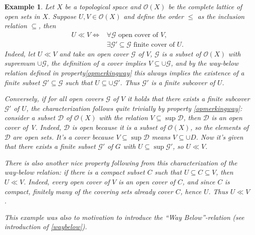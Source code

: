 \documentclass[a4paper,12pt]{article}
\newtheorem{example}[theorem]{Example}
\begin{document}
\begin{example}
Let $X$ be a topological space and $\mathcal{O}(X)$ be the complete lattice of open sets in $X$.  Suppose $U,V \in \mathcal{O}(X)$ and define the order $\leq$ as the inclusion relation $\subseteq$, then
\begin{align*}
 U \ll V \Leftrightarrow &\forall \mathcal{G} \text{ open cover of } V,\\
 &\exists \mathcal{G}' \subseteq \mathcal{G} \text{ finite cover of } U.
\end{align*}
Indeed, let  $U \ll V$ and take an open cover $\mathcal{G}$ of $V$, $\mathcal{G}$ is a subset of $\mathcal{O}(X)$ with supremum $\cup \mathcal{G}$, the definition of a cover implies $V \subseteq  \cup \mathcal{G}$, and by the way-below relation defined in property\ref{opmerkingway} this always implies the existence of a finite subset $\mathcal{G}' \subseteq \mathcal{G}$ such that $U \subseteq \cup\mathcal{G}'$. Thus $\mathcal{G}'$ is a finite subcover of $U$.

Conversely, if for all open covers $\mathcal{G}$ of $V$ it holds that there exists a finite  subcover $\mathcal{G}'$ of $U$, the characterization follows quite trivially by property \ref{opmerkingway}: consider a subset $\mathcal{D}$ of $\mathcal{O}(X)$ with the relation $V \subseteq \sup \mathcal{D}$, then $\mathcal{D}$ is an open cover of V. Indeed, $\mathcal{D}$ is open because it is a subset of $\mathcal{O}(X)$, so the elements of $\mathcal{D}$ are open sets. It's a cover because $V \subseteq \sup \mathcal{D}$ means $V \subseteq \cup D$. Now it's given that there exists a finite subset $\mathcal{G}'$ of $G$ with $U \subseteq \sup \mathcal{G}'$, so $U \ll V$.

There is also another nice property following from this characterization of the way-below relation: if there is a compact subset $C$ such that $U\subseteq C \subseteq V$, then $U\ll V$. Indeed, every open cover of $V$ is an open cover of $C$, and  since $C$ is compact, finitely many of the covering sets already cover $C$, hence $U$. Thus $U \ll V$.

This example was also to motivation to introduce the ``Way Below''-relation (see introduction of \ref{waybelow}).
\end{example}
\end{document}
